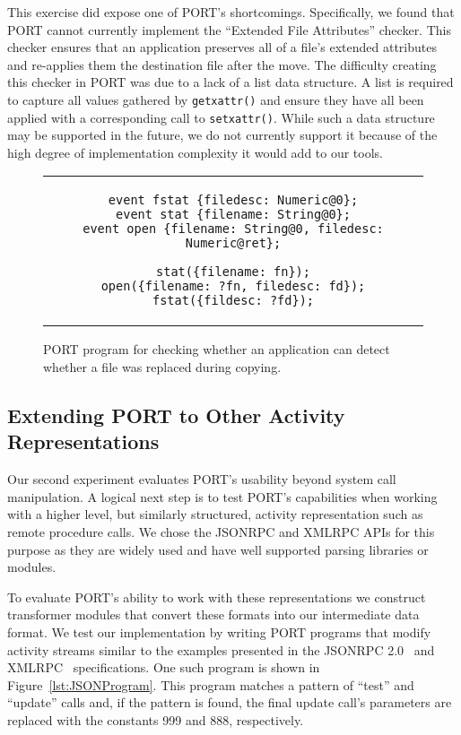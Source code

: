 This exercise did expose one of PORT's shortcomings.  Specifically,
we found that PORT cannot currently implement the ``Extended File
Attributes'' checker.
This checker ensures that an application
preserves all of a file's extended attributes and re-applies them the
destination file after the move.
The difficulty creating this checker
in PORT was due to a lack of a list data structure.
A list is required to capture all values gathered by {\tt getxattr()}
and ensure they have all been applied with a
corresponding call to {\tt setxattr()}.
While such a data structure may be supported in the future,
we do not currently support it because of the high degree of
implementation complexity it would add to our tools.

\begin{figure}
\centering
\begin{tabular}{c}
\begin{lstlisting}
event fstat {filedesc: Numeric@0};
event stat {filename: String@0};
event open {filename: String@0, filedesc: Numeric@ret};

stat({filename: fn});
open({filename: ?fn, filedesc: fd});
fstat({fildesc: ?fd});
\end{lstlisting}
\end{tabular}
\caption{PORT program for checking whether an application can detect whether a file was replaced during copying.}
\label{lst:FileReplacedPORT}
\end{figure}

\subsection{Extending PORT to Other Activity Representations}

Our second experiment evaluates PORT's usability beyond system call manipulation.
A logical next step is to test PORT's capabilities when working
with a higher level, but similarly structured, activity representation such as remote procedure calls.
We chose the JSONRPC and XMLRPC APIs for this purpose as they are widely used and have well
supported parsing libraries or modules.

To evaluate PORT's ability to work with these representations we
construct transformer modules that convert these formats into our
intermediate data format.
We test our implementation by writing PORT programs that modify
activity streams similar to the examples presented in the JSONRPC
2.0~\cite{jsonspec} and XMLRPC~\cite{xmlspec}
specifications.  One such program is shown in
Figure~\ref{lst:JSONProgram}.  This program matches a pattern of ``test''
and ``update'' calls and, if the pattern is found, the final update call's
parameters are replaced with the constants 999 and 888, respectively.

